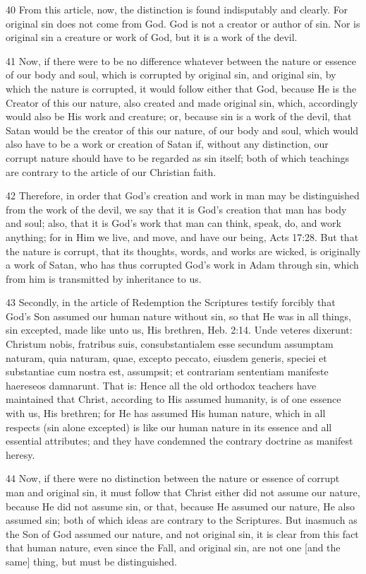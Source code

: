 40 From this article, now, the distinction is found indisputably and clearly. For original sin does not come from God. God is not a creator or author of sin. Nor is original sin a creature or work of God, but it is a work of the devil.

41 Now, if there were to be no difference whatever between the nature or essence of our body and soul, which is corrupted by original sin, and original sin, by which the nature is corrupted, it would follow either that God, because He is the Creator of this our nature, also created and made original sin, which, accordingly would also be His work and creature; or, because sin is a work of the devil, that Satan would be the creator of this our nature, of our body and soul, which would also have to be a work or creation of Satan if, without any distinction, our corrupt nature should have to be regarded as sin itself; both of which teachings are contrary to the article of our Christian faith.

42 Therefore, in order that God’s creation and work in man may be distinguished from the work of the devil, we say that it is God’s creation that man has body and soul; also, that it is God’s work that man can think, speak, do, and work anything; for in Him we live, and move, and have our being, Acts 17:28. But that the nature is corrupt, that its thoughts, words, and works are wicked, is originally a work of Satan, who has thus corrupted God’s work in Adam through sin, which from him is transmitted by inheritance to us.

43 Secondly, in the article of Redemption the Scriptures testify forcibly that God’s Son assumed our human nature without sin, so that He was in all things, sin excepted, made like unto us, His brethren, Heb. 2:14. Unde veteres dixerunt: Christum nobis, fratribus suis, consubstantialem esse secundum assumptam naturam, quia naturam, quae, excepto peccato, eiusdem generis, speciei et substantiae cum nostra est, assumpsit; et contrariam sententiam manifeste haereseos damnarunt. That is: Hence all the old orthodox teachers have maintained that Christ, according to His assumed humanity, is of one essence with us, His brethren; for He has assumed His human nature, which in all respects (sin alone excepted) is like our human nature in its essence and all essential attributes; and they have condemned the contrary doctrine as manifest heresy.

44 Now, if there were no distinction between the nature or essence of corrupt man and original sin, it must follow that Christ either did not assume our nature, because He did not assume sin, or that, because He assumed our nature, He also assumed sin; both of which ideas are contrary to the Scriptures. But inasmuch as the Son of God assumed our nature, and not original sin, it is clear from this fact that human nature, even since the Fall, and original sin, are not one [and the same] thing, but must be distinguished.

